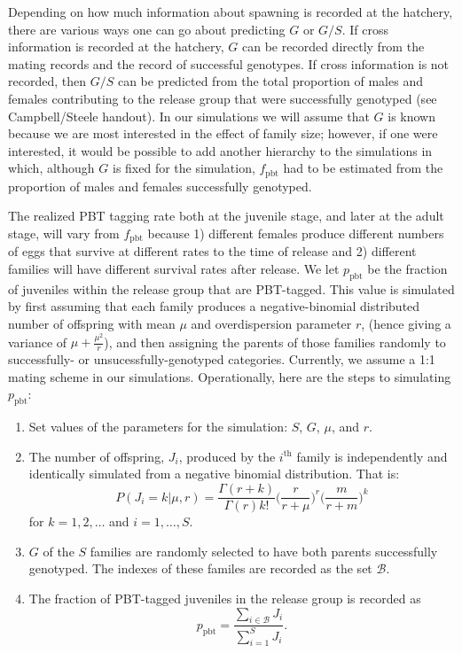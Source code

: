 \documentclass[11pt]{article}
\newcommand{\thh}{^\mathrm{th}}
\begin{document}
 
  
Depending on how much information about spawning is recorded at the hatchery, there are various
ways one can go about predicting $G$ or $G/S$. 
If cross information is recorded at the
hatchery, $G$ can be recorded directly from the mating records and the record of successful genotypes.
If cross information is not recorded, then $G/S$ can be predicted from the total proportion of males and 
females contributing to the release group that were successfully genotyped (see Campbell/Steele handout).
In our simulations we will assume that $G$ is known because we are most interested in the effect of family
size;  however, if one were interested, it would be possible to add another hierarchy to the simulations in which,
although $G$ is fixed for the simulation,  $f_\mathrm{pbt}$ had to be estimated from the proportion of males
and females successfully genotyped.


The realized PBT tagging rate both at the juvenile stage, and later at the adult stage,
will vary from $f_\mathrm{pbt}$ because 1) different females produce different
numbers of eggs that survive at different rates to the time of release and 2) different families
will have different survival rates after release.  We let $p_\mathrm{pbt}$ be the fraction of juveniles
within the release group that are PBT-tagged.  This value is simulated by first assuming that each
family produces a negative-binomial distributed number of offspring with mean $\mu$ and 
overdispersion parameter $r$, (hence giving a variance of $\mu + \frac{\mu^2}{r}$), and then
assigning the parents of those families randomly to successfully- or unsucessfully-genotyped
categories.  Currently, we assume a 1:1 mating scheme in our simulations.  Operationally, here
are the steps to simulating $p_\mathrm{pbt}$:
\begin{enumerate}
\item Set values of the parameters for the simulation: $S$, $G$, $\mu$, and $r$.
\item The number of offspring, $J_i$, produced by the $i\thh$ family is independently and identically simulated 
from a negative binomial distribution.  That is:
\[
P(J_i = k | \mu, r) = \frac{\Gamma(r + k)}{\Gamma(r)k!}\biggl(\frac{r}{r+\mu}\biggr)^r 
\biggl(\frac{m}{r+m}\biggr)^k
\] 
for $k = 1, 2, \ldots$ and $i = 1,\ldots, S$.  
\item $G$ of the $S$ families are randomly selected to have both parents successfully genotyped. The
indexes of these familes are recorded as the set
$\mathcal{B}$.  
\item The fraction of PBT-tagged juveniles in the release group is recorded as
\[
p_\mathrm{pbt} = \frac{\sum_{i\in\mathcal{B}} J_i}{\sum_{i=1}^S J_i}.
\]
\end{enumerate}
 
\end{document}
